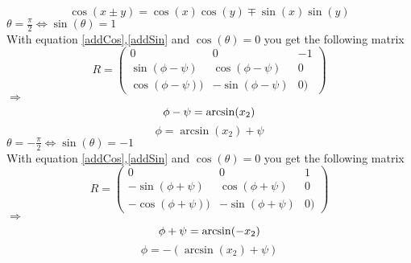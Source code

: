 \documentclass{scrartcl}
\begin{document}
\begin{enumerate}[label={b)}]
\begin{itemize}
	\begin{equation}
	\cos(x\pm y)=\cos(x)\cos(y)\mp \sin(x)\sin(y)
	\label{addCos}
	\end{equation}
	 $\theta= \frac{\pi}{2}\Leftrightarrow\sin(\theta)=1$
	\\ With equation \ref{addCos},\ref{addSin} and $\cos(\theta)=0$	 you get the following matrix
	\begin{equation*}
		R=\begin{pmatrix}
			0& 0&-1\\
			\sin(\phi-\psi)& \cos(\phi-\psi)& 0\\
			\cos(\phi-\psi))&-\sin(\phi-\psi) & 0)
		\end{pmatrix}
	\end{equation*}
	$\Rightarrow$
	\begin{equation*}
		\phi-\psi=\arcsin(x_2)\\
	\end{equation*}
	\begin{equation}
		\phi=\arcsin(x_2)+\psi
	\end{equation}
		 $\theta= -\frac{\pi}{2}\Leftrightarrow\sin(\theta)=-1$
		 \\ With equation \ref{addCos},\ref{addSin} and $\cos(\theta)=0$ you get the following matrix
		 \begin{equation*}
		 	R=\begin{pmatrix}
		 		0& 0& 1\\
		 		-\sin(\phi+\psi)& \cos(\phi+\psi)& 0\\
		 		-\cos(\phi+\psi))&-\sin(\phi+\psi) & 0)
		 	\end{pmatrix}
		 \end{equation*}
		 $\Rightarrow$
		 \begin{equation*}
		 	\phi+\psi=\arcsin(-x_2)\\
		 \end{equation*}
		 \begin{equation}
		 \phi=-(\arcsin(x_2)+\psi)
		 \end{equation}
\end{itemize}

\end{enumerate}


\end{document}
